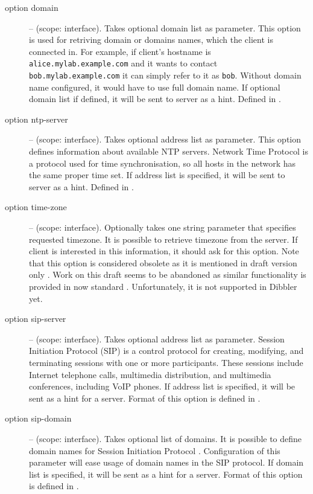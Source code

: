 \begin{description}
 \item[option domain] -- (scope: interface). Takes optional domain
   list as parameter. This option is used for retriving domain or
   domains names, which the client is connected in. For example, if
   client's hostname is \verb+alice.mylab.example.com+ and it wants to
   contact \verb+bob.mylab.example.com+ it can simply refer to it
   as \verb+bob+. Without domain name configured, it would have to use
   full domain name. If optional domain list if defined, it will be
   sent to server as a hint. Defined in \cite{rfc3596}.

 \item[option ntp-server] -- (scope: interface). Takes optional address
   list as parameter. This option defines information about available NTP
   servers. Network Time Protocol \cite{rfc2030} is a protocol used
   for time synchronisation, so all hosts in the network has the same
   proper time set. If address list is specified, it will be sent to
   server as a hint. Defined in \cite{rfc4075}.

 \item[option time-zone] -- (scope: interface). Optionally takes one
   string parameter that specifies requested timezone. It is possible
   to retrieve timezone from the server. If client is interested in
   this information, it should ask for this option. Note that this
   option is considered obsolete as it is mentioned in draft version
   only \cite{draft-timezone}. Work on this draft seems to be
   abandoned as similar functionality is provided in now
   standard \cite{rfc4075}. Unfortunately, it is not supported in
   Dibbler yet.

 \item[option sip-server] -- (scope: interface). Takes optional
   address list as parameter. Session Initiation Protocol
   (SIP) \cite{rfc3263} is a control protocol for creating, modifying,
   and terminating sessions with one or more participants. These
   sessions include Internet telephone calls, multimedia distribution,
   and multimedia conferences, including VoIP phones. If address list
   is specified, it will be sent as a hint for a server. Format of
   this option is defined in \cite{rfc3319}.

 \item[option sip-domain] -- (scope: interface). Takes optional list
   of domains. It is possible to define domain names for Session
   Initiation Protocol \cite{rfc3263}. Configuration of this parameter
   will ease usage of domain names in the SIP protocol. If domain list
   is specified, it will be sent as a hint for a server. Format of
   this option is defined in \cite{rfc3319}.


\end{description}
